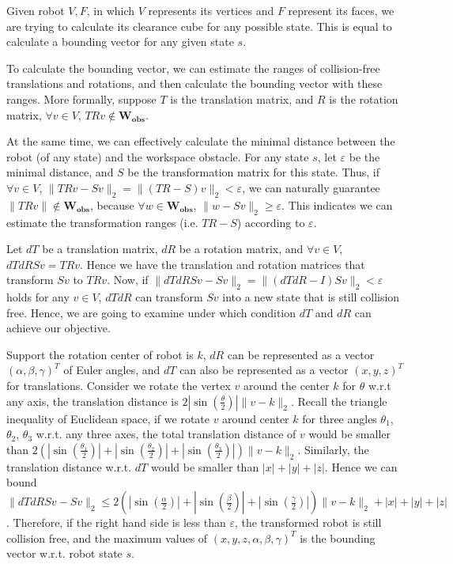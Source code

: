\documentclass[fleqn,reqno]{amsart}
\theoremstyle{definition}
\begin{document}
Given robot ${V,F}$, in which $V$ represents its vertices and $F$ represent
its faces, we are trying to calculate its clearance cube for any possible
state. This is equal to calculate a bounding vector for any given state $s$.

To calculate the bounding vector, we can estimate the ranges of collision-free
translations and rotations, and then calculate the bounding vector with these
ranges. More formally, suppose $T$ is the translation matrix, and $R$ is the
rotation matrix, $\forall v\in V$, $TRv\not\in\mathbf{W_{obs}}$.

At the same time, we can effectively calculate the minimal distance between
the robot (of any state) and the workspace obstacle. For any state $s$, let $\varepsilon$ be the
minimal distance, and $S$ be the transformation matrix for this state. Thus, if
$\forall v\in V$, $\|TRv-Sv\|_2=\|(TR-S)v\|_2<\varepsilon$, we can naturally
guarantee $\|TRv\|\not\in\mathbf{W_{obs}}$, because $\forall
w\in\mathbf{W_{obs}}$, $\|w-Sv\|_2\ge\varepsilon$. This indicates we can
estimate the transformation ranges (i.e. $TR-S$) according to $\varepsilon$.

Let $dT$ be a translation matrix, $dR$ be a rotation matrix, and $\forall v\in
V$, $dTdRSv=TRv$. Hence we have the translation and rotation matrices that
transform $Sv$ to $TRv$. Now, if $\|dTdRSv -
Sv\|_2=\|(dTdR-I)Sv\|_2<\varepsilon$ holds for any $v\in V$, $dTdR$ can
transform $Sv$ into a new state that is still collision free. Hence, we are
going to examine under which condition $dT$ and $dR$ can achieve our
objective.

Support the rotation center of robot is $k$, $dR$ can be represented as a
vector $(\alpha,\beta,\gamma)^T$ of Euler angles, and $dT$ can also be
represented as a vector $(x,y,z)^T$ for translations. Consider we rotate the
vertex $v$ around the center $k$ for $\theta$ w.r.t any axis, the translation
distance is $2|\sin(\frac{\theta}{2})|\|v-k\|_2$. Recall the triangle
inequality of Euclidean space, if we rotate $v$ around center
$k$ for three angles $\theta_1$, $\theta_2$, $\theta_3$ w.r.t. any three axes, the total translation distance of $v$
would be smaller than
$2(|\sin(\frac{\theta_1}{2})|+|\sin(\frac{\theta_2}{2})|+|\sin(\frac{\theta_3}{2})|)\|v-k\|_2$.
Similarly, the translation distance w.r.t. $dT$ would be smaller than
$|x|+|y|+|z|$. Hence we can bound $\|dTdRSv -
Sv\|_2\le2(|\sin(\frac{\alpha}{2})|+|\sin(\frac{\beta}{2})|+|\sin(\frac{\gamma}{2})|)\|v-k\|_2+|x|+|y|+|z|$.
Therefore, if the right hand side is less than $\varepsilon$, the transformed
robot is still collision free, and the maximum values of
$(x,y,z,\alpha,\beta,\gamma)^T$ is the bounding vector w.r.t. robot state $s$.
\end{document}
